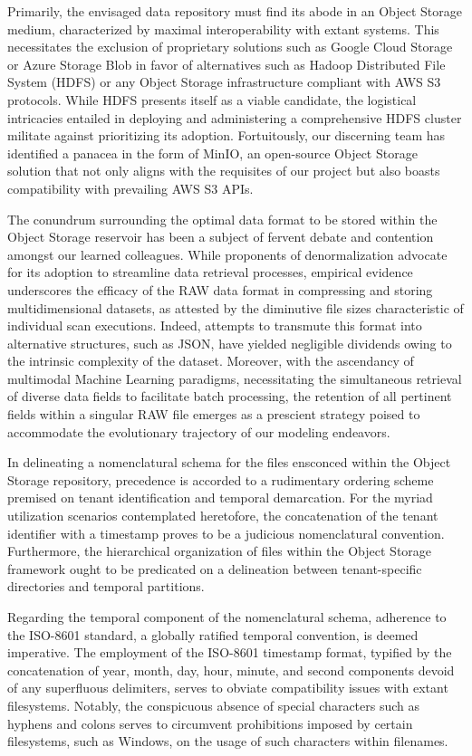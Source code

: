 Primarily, the envisaged data repository must find its abode in an Object
Storage medium, characterized by maximal interoperability with extant systems.
This necessitates the exclusion of proprietary solutions such as Google Cloud
Storage or Azure Storage Blob in favor of alternatives such as Hadoop
Distributed File System (HDFS) \cite{HDFS} or any Object Storage infrastructure
compliant with AWS S3 protocols. While HDFS presents itself as a viable
candidate, the logistical intricacies entailed in deploying and administering a
comprehensive HDFS cluster militate against prioritizing its adoption.
Fortuitously, our discerning team has identified a panacea in the form of MinIO,
an open-source Object Storage solution that not only aligns with the requisites
of our project but also boasts compatibility with prevailing AWS S3 APIs.

The conundrum surrounding the optimal data format to be stored within the Object
Storage reservoir has been a subject of fervent debate and contention amongst
our learned colleagues. While proponents of denormalization advocate for its
adoption to streamline data retrieval processes, empirical evidence underscores
the efficacy of the RAW data format in compressing and storing multidimensional
datasets, as attested by the diminutive file sizes characteristic of individual
scan executions. Indeed, attempts to transmute this format into alternative
structures, such as JSON, have yielded negligible dividends owing to the
intrinsic complexity of the dataset. Moreover, with the ascendancy of multimodal
Machine Learning paradigms, necessitating the simultaneous retrieval of diverse
data fields to facilitate batch processing, the retention of all pertinent
fields within a singular RAW file emerges as a prescient strategy poised to
accommodate the evolutionary trajectory of our modeling endeavors.

In delineating a nomenclatural schema for the files ensconced within the Object
Storage repository, precedence is accorded to a rudimentary ordering scheme
premised on tenant identification and temporal demarcation. For the myriad
utilization scenarios contemplated heretofore, the concatenation of the tenant
identifier with a timestamp proves to be a judicious nomenclatural convention.
Furthermore, the hierarchical organization of files within the Object Storage
framework ought to be predicated on a delineation between tenant-specific
directories and temporal partitions.

Regarding the temporal component of the nomenclatural schema, adherence to the
ISO-8601 standard, a globally ratified temporal convention, is deemed
imperative. The employment of the ISO-8601 timestamp format, typified by the
concatenation of year, month, day, hour, minute, and second components devoid of
any superfluous delimiters, serves to obviate compatibility issues with extant
filesystems. Notably, the conspicuous absence of special characters such as
hyphens and colons serves to circumvent prohibitions imposed by certain
filesystems, such as Windows, on the usage of such characters within filenames.

